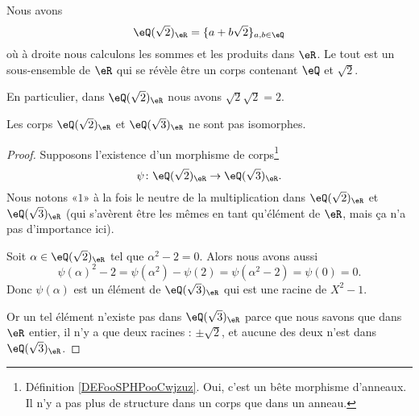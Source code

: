 \begin{example}
	Nous avons
	\begin{equation}
		\eQ(\sqrt{ 2 })_{\eR}=\{ a+b\sqrt{ 2 } \}_{a,b\in \eQ}
	\end{equation}
	où à droite nous calculons les sommes et les produits dans \( \eR\). Le tout est un sous-ensemble de \( \eR\) qui se révèle être un corps contenant \( \eQ\) et \( \sqrt{ 2 }\).

	En particulier, dans \( \eQ(\sqrt{ 2 })_{\eR}\) nous avons \( \sqrt{ 2 }\sqrt{ 2 }=2\).
\end{example}

\begin{lemma}   \label{LEMooKVPZooPqPrce}
	Les corps \( \eQ(\sqrt{ 2 })_{\eR}\) et \( \eQ(\sqrt{ 3 })_{\eR}\) ne sont pas isomorphes.
\end{lemma}

\begin{proof}
	Supposons l'existence d'un morphisme de corps\footnote{Définition \ref{DEFooSPHPooCwjzuz}. Oui, c'est un bête morphisme d'anneaux. Il n'y a pas plus de structure dans un corps que dans un anneau.}
	\begin{equation}
		\psi\colon \eQ(\sqrt{ 2 })_{\eR}\to \eQ(\sqrt{ 3 })_{\eR}.
	\end{equation}
	Nous notons «\( 1\)» à la fois le neutre de la multiplication dans \( \eQ(\sqrt{ 2 })_{\eR}\) et \( \eQ(\sqrt{ 3 })_{\eR}\) (qui s'avèrent être les mêmes en tant qu'élément de \( \eR\), mais ça n'a pas d'importance ici).

	Soit \( \alpha\in \eQ(\sqrt{ 2 })_{\eR}\) tel que \( \alpha^2-2=0\). Alors nous avons aussi
	\begin{equation}
		\psi(\alpha)^2-2=\psi(\alpha^2)-\psi(2)=\psi(\alpha^2-2)=\psi(0)=0.
	\end{equation}
	Donc \( \psi(\alpha)\) est un élément de \( \eQ(\sqrt{ 3 })_{\eR}\) qui est une racine de \( X^2-1\).

	Or un tel élément n'existe pas dans \( \eQ(\sqrt{ 3 })_{\eR}\) parce que nous savons que dans \( \eR\) entier, il n'y a que deux racines : \( \pm\sqrt{ 2 }\), et aucune des deux n'est dans \( \eQ(\sqrt{ 3 })_{\eR}\).
\end{proof}

